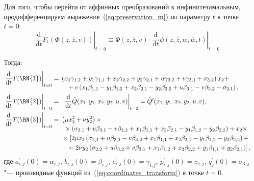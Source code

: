 \documentclass[../main.tex]{subfiles}
\begin{document}
Для того, чтобы перейти от аффинных преобразований к инфинитезимальным, продифференцируем выражение~(\ref{eq:preservation_m}) по параметру $t$ в точке $t = 0$:
\begin{equation}\label{eq:diff}
\left.\frac{\mathrm d}{\mathrm{d}t} F_t\left(\Phi(z, \overline{z}, v)\right)\right|_{t = 0} \equiv \Phi(z, \overline{z}, v) \cdot \left.\frac{\mathrm d}{\mathrm{d}t}\psi(z, \overline{z}, w, \overline{w}, t)\right|_{t=0}
\end{equation}

Тогда:
\begin{align*}
\left.\frac{\mathrm d}{\mathrm{d}t}T(\mathrm{\RN{1}})\right|_{t = 0} &= 
\begin{multlined}[t]
\left(x_1 \gamma_{1,2}+y_1 \gamma_{1,1}+x_2 \gamma_{2,2}+y_2 \gamma_{2,1} + u \gamma_{3,2}+v \gamma_{3,1}+\sigma_{3,2}\right) x_2 + \\ 
 + v \left(x_1 \beta_{1,1}-y_1 \beta_{1,2}+x_2 \beta_{2,1}-y_2 \beta_{2,2} + u \beta_{3,1}-v \beta_{3,2}+\sigma_{2,1}\right),
\end{multlined}\nonumber\\
\left.\frac{\mathrm d}{\mathrm{d}t}T(\mathrm{\RN{2}})\right|_{t = 0} &= 
\begin{multlined}[t]
\ \left.\frac{\mathrm d}{\mathrm{d}t}\tilde{Q}(x_1,y_1,x_2,y_2,u,v)\right|_{t=0} = \tilde{Q}^{\prime}(x_1,y_1,x_2,y_2,u,v),
\end{multlined}\\
\left.\frac{\mathrm d}{\mathrm{d}t}T(\mathrm{\RN{3}})\right|_{t = 0} &= 
\begin{multlined}[t]
\left(\mu  x_2^2+\nu  y_2^2\right) \times \\
\times\left(\sigma _{2,1}+u \beta _{3,1}-v \beta _{3,2}+x_1 \beta _{1,1}+x_2 \beta _{2,1}-y_1 \beta _{1,2}-y_2 \beta_{2,2}\right)+x_2 \times \\
\times\left[2 \mu  x_2 \left(\sigma _{2,1}+u \beta _{3,1}-v \beta _{3,2}+x_1 \beta _{1,1}+x_2 \beta _{2,1}-y_1 \beta _{1,2}-y_2 \beta_{2,2}\right)+\right. \\
+ \left.2 \nu  y_2 \left(\sigma _{2,2}+u \beta _{3,2}+v \beta _{3,1}+x_1 \beta _{1,2}+x_2 \beta _{2,2}+y_1 \beta _{1,1}+y_2 \beta_{2,1}\right)\right],\nonumber
\end{multlined}
\end{align*}
где $a^{\prime}_{i,j}(0) = \alpha_{i,j}$, $b^{\prime}_{i,j}(0) = \beta_{i,j}$, $c^{\prime}_{i,j}(0) = \gamma_{i,j}$, $p^{\prime}_{i,j}(0) = \sigma_{i,j}$, $q^{\prime}_{j}(0) = \sigma_{3,j}$ "--- производные функций из~(\ref{eq:coordinates_transform}) в точке $t = 0$. 
\end{document}
